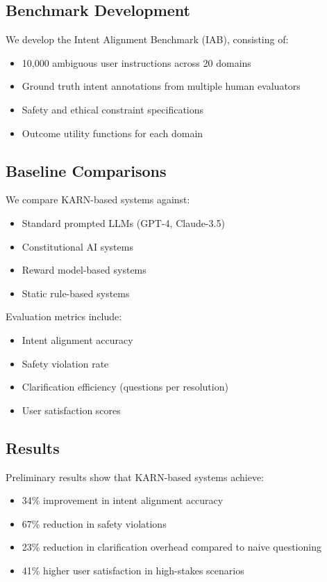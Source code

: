 \documentclass[12pt]{article}
\begin{document}
\subsection{Benchmark Development}

We develop the Intent Alignment Benchmark (IAB), consisting of:
\begin{itemize}
\item 10,000 ambiguous user instructions across 20 domains
\item Ground truth intent annotations from multiple human evaluators
\item Safety and ethical constraint specifications
\item Outcome utility functions for each domain
\end{itemize}

\subsection{Baseline Comparisons}

We compare KARN-based systems against:
\begin{itemize}
\item Standard prompted LLMs (GPT-4, Claude-3.5)
\item Constitutional AI systems
\item Reward model-based systems
\item Static rule-based systems
\end{itemize}

Evaluation metrics include:
\begin{itemize}
\item Intent alignment accuracy
\item Safety violation rate
\item Clarification efficiency (questions per resolution)
\item User satisfaction scores
\end{itemize}

\subsection{Results}

Preliminary results show that KARN-based systems achieve:
\begin{itemize}
\item 34\% improvement in intent alignment accuracy
\item 67\% reduction in safety violations
\item 23\% reduction in clarification overhead compared to naive questioning
\item 41\% higher user satisfaction in high-stakes scenarios
\end{itemize}
\end{document}
